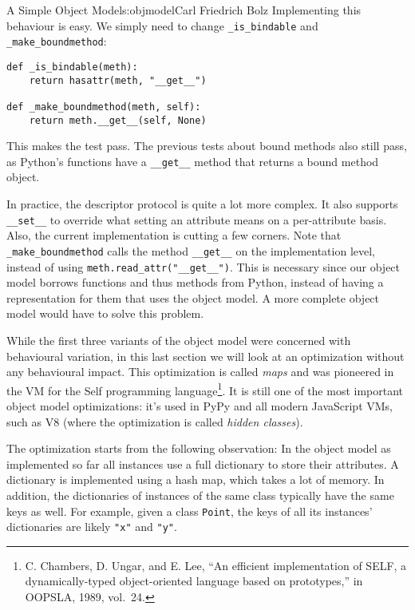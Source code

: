 \begin{aosachapter}{A Simple Object Model}{s:objmodel}{Carl Friedrich Bolz}
Implementing this behaviour is easy. We simply need to change
\texttt{\_is\_bindable} and \texttt{\_make\_boundmethod}:

\begin{verbatim}
def _is_bindable(meth):
    return hasattr(meth, "__get__")

def _make_boundmethod(meth, self):
    return meth.__get__(self, None)
\end{verbatim}

This makes the test pass. The previous tests about bound methods also
still pass, as Python's functions have a \texttt{\_\_get\_\_} method
that returns a bound method object.

In practice, the descriptor protocol is quite a lot more complex. It
also supports \texttt{\_\_set\_\_} to override what setting an attribute
means on a per-attribute basis. Also, the current implementation is
cutting a few corners. Note that \texttt{\_make\_boundmethod} calls the
method \texttt{\_\_get\_\_} on the implementation level, instead of
using \texttt{meth.read\_attr("\_\_get\_\_")}. This is necessary since
our object model borrows functions and thus methods from Python, instead
of having a representation for them that uses the object model. A more
complete object model would have to solve this problem.

\label{instance-optimization}

While the first three variants of the object model were concerned with
behavioural variation, in this last section we will look at an
optimization without any behavioural impact. This optimization is called
\emph{maps} and was pioneered in the VM for the Self programming
language\footnote{C. Chambers, D. Ungar, and E. Lee, ``An efficient
  implementation of SELF, a dynamically-typed object-oriented language
  based on prototypes,'' in OOPSLA, 1989, vol.~24.}. It is still one of
the most important object model optimizations: it's used in PyPy and all
modern JavaScript VMs, such as V8 (where the optimization is called
\emph{hidden classes}).

The optimization starts from the following observation: In the object
model as implemented so far all instances use a full dictionary to store
their attributes. A dictionary is implemented using a hash map, which
takes a lot of memory. In addition, the dictionaries of instances of the
same class typically have the same keys as well. For example, given a
class \texttt{Point}, the keys of all its instances' dictionaries are
likely \texttt{"x"} and \texttt{"y"}.


\end{aosachapter}
